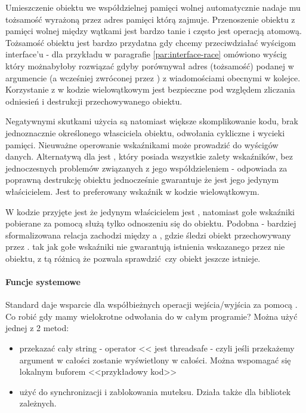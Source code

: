 Umieszczenie obiektu we współdzielnej pamięci wolnej automatycznie nadaje mu tożsamość wyrażoną przez adres pamięci którą zajmuje. Przenoszenie obiektu z pamięci wolnej między wątkami jest bardzo tanie i często jest operacją atomową. Tożsamość obiektu jest bardzo przydatna gdy chcemy przeciwdziałać wyścigom interface'u - dla przykładu w paragrafie \ref{par:interface-race} omówiono wyścig który możnabyłoby rozwiązać gdyby  porównywał adres (tożsamość) podanej w argumencie (a wcześniej zwróconej przez ) z wiadomościami obecnymi w kolejce. Korzystanie z  w kodzie wielowątkowym jest bezpieczne pod względem zliczania odniesień i destrukcji przechowywanego obiektu.

Negatywnymi skutkami użycia  są natomiast większe skomplikowanie kodu, brak jednoznacznie określonego własciciela obiektu, odwołania cykliczne i wycieki pamięci. Nieuważne operowanie wskaźnikami może prowadzić do wyścigów danych.
Alternatywą dla  jest , który posiada wszystkie zalety wskaźników, bez jednoczesnych problemów związanych z jego współdzieleniem - odpowiada za poprawną destrukcję obiektu jednocześnie gwarantuje że jest jego jedynym właścicielem. Jest to preferowany wskaźnik w kodzie wielowątkowym.

W kodzie przyjęte jest że jedynym właścicielem jest , natomiast gołe wskaźniki pobierane za pomocą  służą tylko odnoszeniu się do obiektu.
Podobna - bardziej sformalizowana relacja zachodzi między  a , gdzie  śledzi obiekt przechowywany przez .
 tak jak gołe wskaźniki nie gwarantują istnienia wskazanego przez nie obiektu, z tą różnicą że  pozwala sprawdzić czy obiekt jeszcze istnieje.

\paragraph{Funcje systemowe}
Standard  daje wsparcie dla współbieżnych operacji wejścia/wyjścia za pomocą . Co robić gdy mamy wielokrotne odwołania do  w całym programie? Można użyć jednej z 2 metod:
\begin{itemize}
\item przekazać cały string - operator <{}< jest threadsafe - czyli jeśli przekażemy argument w całości zostanie wyświetlony w całości. Można wspomagać się lokalnym buforem <<przykładowy kod>>
\item użyć  do synchronizacji i zablokowania muteksu. Działa także dla bibliotek zależnych.
\end{itemize}

